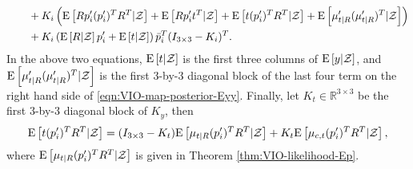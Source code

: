 \begin{theorem}
\begin{align}
		&\qquad + K_i \left( \mathrm{E}\left[ Rp'_i(p'_i)^TR^T | \mathcal{Z} \right] + \mathrm{E}\left[ Rp'_it^T|\mathcal{Z} \right] + \mathrm{E}\left[ t(p'_i)^TR^T|\mathcal{Z} \right] + \mathrm{E}\left[ \mu'_{t|R}(\mu'_{t|R})^T|\mathcal{Z} \right] \right) \nonumber \\
		&\qquad + K_i \left( \mathrm{E}\left[ R|\mathcal{Z} \right]p'_i + \mathrm{E}\left[ t|\mathcal{Z} \right] \right) \bar{p}_i^T (I_{3\times 3}-K_i)^T.
	\end{align}
	In the above two equations, $\mathrm{E}\left[ t|\mathcal{Z} \right]$ is the first three columns of $\mathrm{E}\left[ y|\mathcal{Z} \right]$, and $\mathrm{E}\left[ \mu'_{t|R}(\mu'_{t|R})^T|\mathcal{Z} \right]$ is the first 3-by-3 diagonal block of the last four term on the right hand side of \eqref{eqn:VIO-map-posterior-Eyy}.
	Finally, let $K_t \in \mathbb{R}^{3\times 3}$ be the first 3-by-3 diagonal block of $K_y$, then
	\begin{align}
		\mathrm{E}\left[ t(p'_i)^TR^T|\mathcal{Z} \right] = (I_{3\times 3}-K_t) \mathrm{E}\left[ \mu_{t|R}(p'_i)^TR^T|\mathcal{Z} \right] + K_t \mathrm{E}\left[ \mu_{c,t}(p'_i)^TR^T|\mathcal{Z} \right],
	\end{align}
	where $\mathrm{E}\left[ \mu_{t|R}(p'_i)^TR^T|\mathcal{Z} \right]$ is given in Theorem \ref{thm:VIO-likelihood-Ep}.
\end{theorem}
